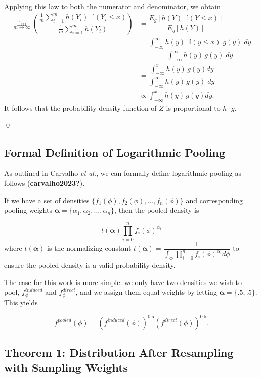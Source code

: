 \documentclass[12pt,twoside]{smiththesis}
\begin{document}
Applying this law to both the numerator and denominator, we obtain
\begin{align*}  \lim_{m \to \infty} \left( \dfrac{ \frac 1m {\sum_{i=1}^mh(Y_i) }  \;\;\mathbb{I} (Y_i \leq x) }{\frac 1m \sum_{i=1}^mh(Y_i) } \right) &= \dfrac{ E_g[ h(Y) \;\; \mathbb I (Y \leq x) ]  }{ E_g[ h(Y) ]  }\\
&= \dfrac{\int_{-\infty}^\infty h(y) \;\; \mathbb I (y \leq x) \; g(y) \; dy}{\int_{-\infty}^\infty h(y) \, g(y) \;dy}\\
&= \dfrac{\int_{-\infty}^x h(y) \, g(y) dy}{\int_{-\infty}^\infty h(y) \, g(y) \;dy}\\
&\propto \int_{-\infty}^x h(y) \, g(y) dy. 
\end{align*}
It follows that the probability density function of \(Z\) is proportional to \(h \cdot g\).

\vspace{3 mm}

\qed

\hypertarget{formal-definition-of-logarithmic-pooling}{%
\subsection{Formal Definition of Logarithmic Pooling}\label{formal-definition-of-logarithmic-pooling}}

As outlined in Carvalho \emph{et al.}, we can formally define logarithmic pooling as follows (\textbf{carvalho2023?}).

If we have a set of densities \(\{ f_1(\phi), f_2(\phi), \ldots, f_n(\phi)\}\) and corresponding pooling weights \(\boldsymbol{\alpha}=\{\alpha_1, \alpha_2, \ldots, \alpha_n\}\), then the pooled density is

\[ t(\boldsymbol{\alpha}) \prod_{i=0}^n f_i(\phi)^{\alpha_i}\] where \(t(\boldsymbol{\alpha})\) is the normalizing constant \(t(\boldsymbol{\alpha}) = \dfrac{1}{ \int_{\Phi}\prod_{i=0}^n f_i(\phi)^{\alpha_i} d\phi}\) to ensure the pooled density is a valid probability density.

The case for this work is more simple: we only have two densities we wish to pool, \(f_\phi^{induced}\) and \(f_\phi^{direct}\), and we assign them equal weights by letting \(\boldsymbol{\alpha} = \{.5, .5\}\). This yields

\[f^{pooled}(\phi) = \left( f^{induced} (\phi) \right)^{0.5} \left( f^{direct} (\phi) \right)^{0.5}.\]

\hypertarget{theorem-1-distribution-after-resampling-with-sampling-weights}{%
\subsection{Theorem 1: Distribution After Resampling with Sampling Weights}\label{theorem-1-distribution-after-resampling-with-sampling-weights}}
\end{document}
